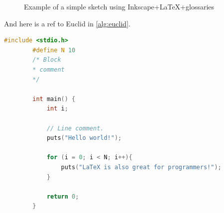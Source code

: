 \documentclass[a4paper]{article}  %
\begin{document}
	\begin{figure}[htbp]
		\centering
		\caption{Example of a simple sketch using Inkscape+\LaTeX+glossaries}
		\label{ch1:fig:D1Q5}
	\end{figure}

	\begin{table}[htbp]
		\caption{Example of table tabularray+CSV+glossaries+SIunitX.}
		\label{tab:test}
	\end{table}

	\begin{table}[htbp]
		\caption{Example of table standalone manual tabularray.}
		\label{tab:test_manual}
	\end{table}

	\begin{algorithm}%
		\caption{Example using 'pseudo': Euclid's algorithm, (a, b)}
		\label{alg:euclid}
	\end{algorithm}

	And here is a ref to Euclid in \cref{alg:euclid}.

	\FloatBarrier

	\begin{lstlisting}[language=C++, frame=single, caption=An extract of \lstinline$C++$ code using 'listing'., gobble=8]
		#include <stdio.h>
		#define N 10
		/* Block
		* comment
		*/

		int main() {
			int i;

			// Line comment.
			puts("Hello world!");

			for (i = 0; i < N; i++){
				puts("LaTeX is also great for programmers!");
			}

			return 0;
		}
	\end{lstlisting}
\end{document}
